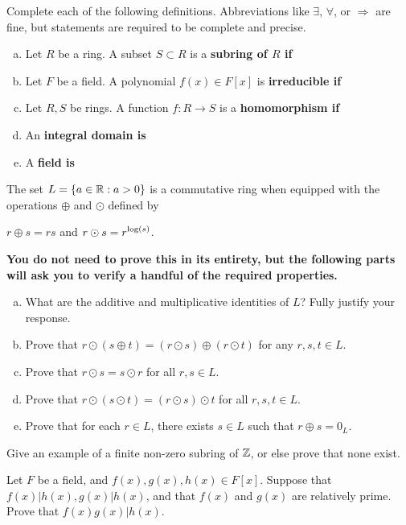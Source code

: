 \documentclass[11pt]{exam}
\begin{document}
\newpage %

%
%
%

\begin{questions}
\question[10] Complete each of the following definitions.  Abbreviations like $\exists$, $\forall$, or $\Rightarrow$ are fine, but statements are required to be complete and precise.
\begin{enumerate}[(a)]
\item Let $R$ be a ring.  A subset $S\subset R$ is a \bf subring \md of $R$ if
\vfill

\item Let $F$ be a field.  A polynomial $f(x)\in F[x]$ is \bf irreducible \md if 
\vfill

\item Let $R,S$ be rings.  A function $f:R\to S$ is a \bf homomorphism \md if
\vfill

\item An \bf integral domain \md is
\vfill

\item A \bf field \md is
\vfill

\end{enumerate}
\newpage

\question[10] The set $L = \left\{a\in\mathbb{R}:a > 0\right\}$ is a commutative ring when equipped with the operations $\oplus$ and $\odot$ defined by
\begin{center}
$r\oplus s = rs$ and $r\odot s = \displaystyle{r^{\log(s)}}$.
\end{center}
\textbf{You do not need to prove this in its entirety, but the following parts will ask you to verify a handful of the required properties.}
\begin{enumerate}[(a)]
\item What are the additive and multiplicative identities of $L$?  Fully justify your response.
\item Prove that $r\odot(s \oplus t) = (r\odot s) \oplus (r \odot t)$ for any $r,s,t\in L$.
\item Prove that $r\odot s = s \odot r$ for all $r,s\in L$.
\item Prove that $r\odot (s \odot t) = (r \odot s) \odot t$ for all $r,s,t\in L$.
\item Prove that for each $r\in L$, there exists $s\in L$ such that $r \oplus s = 0_{L}$.
\end{enumerate}
\newpage

\question[5] Give an example of a finite non-zero subring of $\mathbb{Z}$, or else prove that none exist.
\vfill

\newpage

\question[5] Let $F$ be a field, and $f(x),g(x), h(x)\in F[x]$.  Suppose that $f(x)|h(x),  g(x)|h(x)$, and that $f(x)$ and $g(x)$ are relatively prime.  Prove that $f(x)g(x)|h(x)$.
\end{questions}
\end{document}
